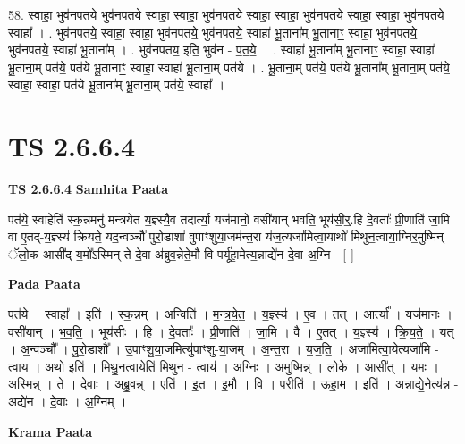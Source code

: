\documentclass[17pt]{extarticle}
\begin{document}
58. स्वाहा॒ भुव॑नपतये॒ भुव॑नपतये॒ स्वाहा॒ स्वाहा॒ भुव॑नपतये॒ स्वाहा॒ स्वाहा॒ भुव॑नपतये॒ स्वाहा॒ स्वाहा॒ भुव॑नपतये॒ स्वाहा᳚ । . भुव॑नपतये॒ स्वाहा॒ स्वाहा॒ भुव॑नपतये॒ भुव॑नपतये॒ स्वाहा॑ भू॒ताना᳚म् भू॒तानाꣳ॒॒ स्वाहा॒ भुव॑नपतये॒ भुव॑नपतये॒ स्वाहा॑ भू॒ताना᳚म् । . भुव॑नपतय॒ इति॒ भुव॑न - प॒त॒ये॒ । . स्वाहा॑ भू॒ताना᳚म् भू॒तानाꣳ॒॒ स्वाहा॒ स्वाहा॑ भू॒ताना॒म् पत॑ये॒ पत॑ये भू॒तानाꣳ॒॒ स्वाहा॒ स्वाहा॑ भू॒ताना॒म् पत॑ये । . भू॒ताना॒म् पत॑ये॒ पत॑ये भू॒ताना᳚म् भू॒ताना॒म् पत॑ये॒ स्वाहा॒ स्वाहा॒ पत॑ये भू॒ताना᳚म् भू॒ताना॒म् पत॑ये॒ स्वाहा᳚ । \newline
\pagebreak
{}

\section{ TS 2.6.6.4 }

\textbf{TS 2.6.6.4 } \newline
\textbf{Samhita Paata} \newline

पत॑ये॒ स्वाहेति॑ स्क॒न्नमनु॑ मन्त्रयेत य॒ज्ञ्स्यै॒व तदार्त्या॒ यज॑मानो॒ वसी॑यान् भवति॒ भूय॑सी॒र्॒.हि दे॒वताः᳚ प्री॒णाति॑ जा॒मि वा ए॒तद्-य॒ज्ञ्स्य॑ क्रियते॒ यद॒न्वञ्चौ॑ पुरो॒डाशा॑ वुपाꣳशुया॒जम॑न्त॒रा य॑ज॒त्यजा॑मित्वा॒याथो॑ मिथुन॒त्वाया॒ग्निर॒मुष्मि॑न् ॅलो॒क आसी᳚द्-य॒मो᳚ऽस्मिन् ते दे॒वा अ॑ब्रुव॒न्नेते॒मौ वि पर्यू॑हा॒मेत्य॒न्नाद्ये॑न दे॒वा अ॒ग्नि - [  ] \newline

\textbf{Pada Paata} \newline

पत॑ये । स्वाहा᳚ । इति॑ । स्क॒न्नम् । अन्विति॑ ।   म॒न्त्र॒ये॒त॒ । य॒ज्ञ्स्य॑ । ए॒व । तत् । आर्त्या᳚ । यज॑मानः । वसी॑यान् । भ॒व॒ति॒ । भूय॑सीः । हि । दे॒वताः᳚ । प्री॒णाति॑ । जा॒मि । वै । ए॒तत् । य॒ज्ञ्स्य॑ । क्रि॒य॒ते॒ । यत् । अ॒न्वञ्चौ᳚ । पु॒रो॒डाशौ᳚ । उ॒पाꣳ॒॒शु॒या॒जमित्यु॑पाꣳशु-या॒जम् । अ॒न्त॒रा । य॒ज॒ति॒ । अजा॑मित्वा॒येत्यजा॑मि - त्वा॒य॒ । अथो॒ इति॑ । मि॒थु॒न॒त्वायेति॑ मिथुन - त्वाय॑ । अ॒ग्निः । अ॒मुष्मिन्न्॑ । लो॒के । आसी᳚त् । य॒मः । अ॒स्मिन्न् । ते । दे॒वाः । अ॒ब्रु॒व॒न्न् । एति॑ । इ॒त॒ । इ॒मौ । वि । परीति॑ । ऊ॒हा॒म॒ । इति॑ । अ॒न्नाद्ये॒नेत्य॑न्न - अद्ये॑न ।   दे॒वाः । अ॒ग्निम् ।  \newline


\textbf{Krama Paata} \newline
\end{document}
